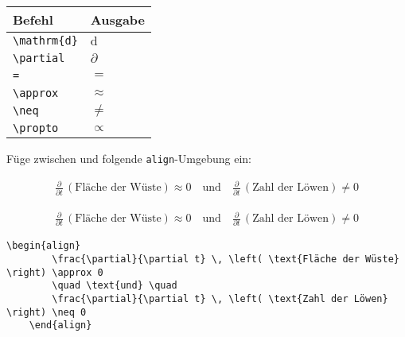 \documentclass["WS\space 16-17\space -\space LaTeX-Kurs\space -\space Praesentation\space -\space 1.tex"]{subfiles}
\begin{document}
\begin{frame}[fragile]
	\begin{center}
		\begin{tabular}{ll}
			\toprule
			Befehl							&	Ausgabe					\\ \midrule
			\lstinline|\mathrm{d}|		&	$\mathrm{d}$		\\
			\lstinline|\partial|		&	$\partial$		
			\\
			\lstinline|=|		&	$=$		
      \\
			\lstinline|\approx|		&	$\approx$		
			\\
			\lstinline|\neq|					&	$\neq$		\\
	        \lstinline|\propto|					&	$\propto$		\\
			\bottomrule
		\end{tabular}
	\end{center}
	\pause\btVFill
	\Aufgabee
		Füge zwischen  und  folgende \lstinline[basicstyle=\normalfont\normalsize]|align|-Umgebung ein:
	\begin{outputbox}
	    \begin{align}
		    \frac{\partial}{\partial t} \, \left( \text{Fläche der Wüste} \right) \approx 0
		    \quad \text{und} \quad
		      \frac{\partial}{\partial t} \, \left( \text{Zahl der Löwen} \right) \neq 0
		\end{align}	
    \end{outputbox}
	\vspace{0.3cm}
\end{frame}
\begin{frame}[fragile]
	\Losung
	\begin{outputbox}
	    \begin{align}
	        \frac{\partial}{\partial t} \, \left( \text{Fläche der Wüste} \right) \approx 0
	        \quad \text{und} \quad
	        \frac{\partial}{\partial t} \, \left( \text{Zahl der Löwen} \right) \neq 0
	    \end{align}
	\end{outputbox}

	\Code
	\begin{lstlisting}[gobble=4]
    \begin{align}
        \frac{\partial}{\partial t} \, \left( \text{Fläche der Wüste} \right) \approx 0
        \quad \text{und} \quad
        \frac{\partial}{\partial t} \, \left( \text{Zahl der Löwen} \right) \neq 0
    \end{align}
	\end{lstlisting}
\end{frame}
\end{document}
